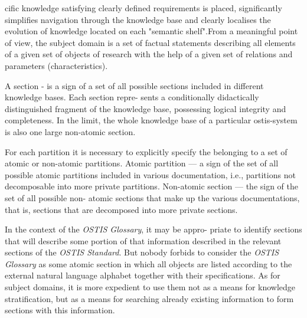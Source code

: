 \documentclass{article}
\begin{document}
 
\setlength{\parskip}{0.023cm}
\begin{multicols}{2}

cific knowledge satisfying clearly defined requirements
is placed, significantly simplifies navigation through the
knowledge base and clearly localises the evolution of
knowledge located on each "semantic shelf".From a
meaningful point of view, the subject domain is a set
of factual statements describing all elements of a given
set of objects of research with the help of a given set of
relations and parameters (characteristics). 

\quad
A section - is a sign of a set of all possible sections
included in different knowledge bases. Each section repre-
sents a conditionally didactically distinguished fragment
of the knowledge base, possessing logical integrity and
completeness. In the limit, the whole knowledge base
of a particular ostis-system is also one large non-atomic
section.

\quad
For each partition it is necessary to explicitly specify
the belonging to a set of atomic or non-atomic partitions.
Atomic partition — a sign of the set of all possible atomic
partitions included in various documentation, i.e., partitions not decomposable into more private partitions. Non-atomic section — the sign of the set of all possible non-
atomic sections that make up the various documentations,
that is, sections that are decomposed into more private
sections.

\quad
In the context of the \textit{OSTIS Glossary}, it may be appro-
priate to identify sections that will describe some portion
of that information described in the relevant sections
of the \textit{OSTIS Standard}. But nobody forbids to consider
the \textit{OSTIS Glossary} as some atomic section in which
all objects are listed according to the external natural
language alphabet together with their specifications. As
for subject domains, it is more expedient to use them
not as a means for knowledge stratification, but as a
means for searching already existing information to form
sections with this information.



\begin{itemize}


\end{itemize}
\end{multicols}
\end{document}
